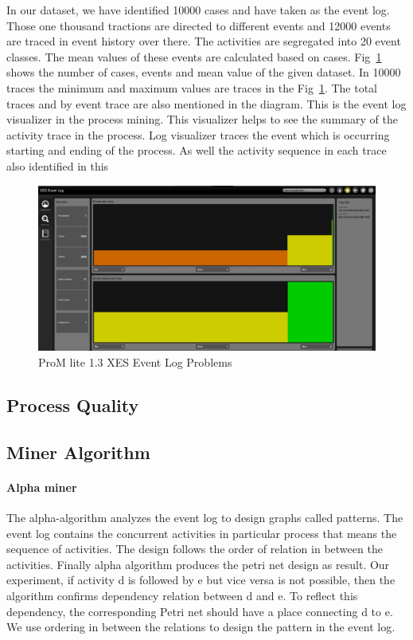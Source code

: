 In our dataset, we have identified 10000 cases and have taken as the event log. Those one thousand tractions are directed to different events and 12000 events are traced in event history over there. The activities are segregated into 20 event classes. The mean values of these events are calculated based on cases. Fig~\ref{figure:promXESEvent} shows the number of cases, events and mean value of the given dataset. In 10000 traces the minimum and maximum values are traces in the Fig~\ref{figure:promXESEvent}. The total traces and by event trace are also mentioned in the diagram. This is the event log visualizer in the process mining. This visualizer helps to see the summary of the activity trace in the process. Log visualizer traces the event which is occurring starting and ending of the process. As well the activity sequence in each trace also identified in this

\begin{figure}[!htb]
    \centering 
    \includegraphics[scale=0.3]{resource/XESEventLog.JPG}
    \caption{ProM lite 1.3 XES Event Log Problems}
    \label{figure:promXESEvent}
\end{figure}


\subsection{Process Quality}

\subsection{Miner Algorithm}

\paragraph{Alpha miner}

The alpha-algorithm analyzes the event log to design graphs called patterns. The event log contains the concurrent activities in particular process that means the sequence of activities. The design follows the order of relation in between the activities. Finally alpha algorithm produces the petri net design as result. Our experiment, if activity d is followed by e but vice versa is not possible, then the algorithm confirms dependency relation between d and e. To reflect this dependency, the corresponding Petri net should have a place connecting d to e. We use ordering in between the relations to design the pattern in the event log.


